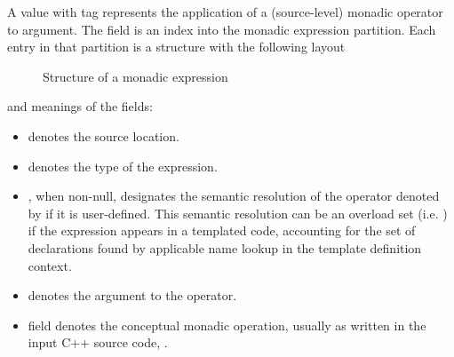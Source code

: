 A  value with tag  represents the application of a (source-level) monadic operator to argument.
The  field is an index into the monadic expression partition.
Each entry in that partition is a structure with the following layout
%
\begin{figure}[H]
	\centering
	\caption{Structure of a monadic expression}
	\label{fig:ifc-monadic-expression-structure}
\end{figure}
%
and meanings of the fields:
\begin{itemize}
	\item {} denotes the source location.
	\item {} denotes the type of the expression.
	\item {}, when non-null, designates the semantic resolution of the operator denoted by  if it is user-defined.
	This semantic resolution can be an overload set (i.e. ) if the expression appears in a templated code,
	accounting for the set of declarations found by applicable name lookup in the template definition context.
	\item {} denotes the argument to the operator.
	\item {} field denotes the conceptual monadic operation, usually as written in the input C++ source code, 
	.
\end{itemize}



\subsection{}
\label{sec:ifc:ExprSort:Dyad}

